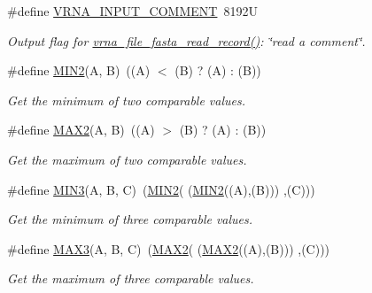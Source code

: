\begin{DoxyCompactItemize}
\#define \hyperlink{group__utils_gaf2062e0eeefffd3ed639af460b3d4fab}{V\+R\+N\+A\+\_\+\+I\+N\+P\+U\+T\+\_\+\+C\+O\+M\+M\+E\+NT}~8192U
\begin{DoxyCompactList}\small\item\em Output flag for \hyperlink{group__file__formats_ga8cfb7e271efc9e1f34640acb85475639}{vrna\+\_\+file\+\_\+fasta\+\_\+read\+\_\+record()}\+: {\itshape \char`\"{}read a comment\char`\"{}}. \end{DoxyCompactList}\item 
\mbox{\label{group__utils_gae0b9cd0ce090bd69b951aa73e8fa4f7d}} 
\#define \hyperlink{group__utils_gae0b9cd0ce090bd69b951aa73e8fa4f7d}{M\+I\+N2}(A,  B)~((A) $<$ (B) ? (A) \+: (B))
\begin{DoxyCompactList}\small\item\em Get the minimum of two comparable values. \end{DoxyCompactList}\item 
\mbox{\label{group__utils_ga33297b3679c713b0c4d897cd0fe3b122}} 
\#define \hyperlink{group__utils_ga33297b3679c713b0c4d897cd0fe3b122}{M\+A\+X2}(A,  B)~((A) $>$ (B) ? (A) \+: (B))
\begin{DoxyCompactList}\small\item\em Get the maximum of two comparable values. \end{DoxyCompactList}\item 
\mbox{\label{group__utils_ga721b8d5f3abef17f10293f1f7f8c958e}} 
\#define \hyperlink{group__utils_ga721b8d5f3abef17f10293f1f7f8c958e}{M\+I\+N3}(A,  B,  C)~(\hyperlink{group__utils_gae0b9cd0ce090bd69b951aa73e8fa4f7d}{M\+I\+N2}(  (\hyperlink{group__utils_gae0b9cd0ce090bd69b951aa73e8fa4f7d}{M\+I\+N2}((A),(B))) ,(C)))
\begin{DoxyCompactList}\small\item\em Get the minimum of three comparable values. \end{DoxyCompactList}\item 
\mbox{\label{group__utils_ga8d577123d2e66d2b7d0bf9af6e172b93}} 
\#define \hyperlink{group__utils_ga8d577123d2e66d2b7d0bf9af6e172b93}{M\+A\+X3}(A,  B,  C)~(\hyperlink{group__utils_ga33297b3679c713b0c4d897cd0fe3b122}{M\+A\+X2}(  (\hyperlink{group__utils_ga33297b3679c713b0c4d897cd0fe3b122}{M\+A\+X2}((A),(B))) ,(C)))
\begin{DoxyCompactList}\small\item\em Get the maximum of three comparable values. \end{DoxyCompactList}\end{DoxyCompactItemize}
